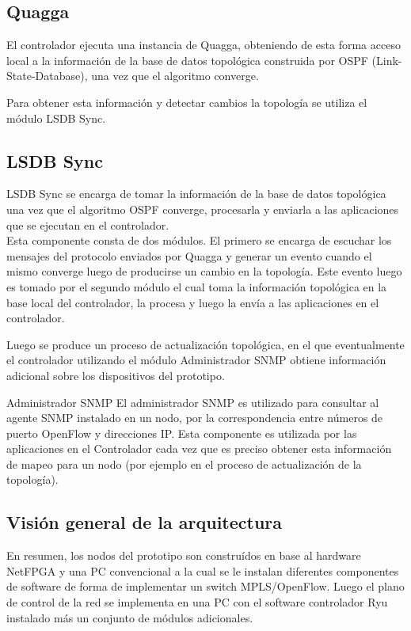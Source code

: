 \subsection{Quagga}
El controlador ejecuta una instancia de Quagga, obteniendo de esta forma acceso local a la información de la base de datos topol\'ogica construida por OSPF (Link-State-Database), una vez que el algoritmo converge.

Para obtener esta informaci\'on y detectar cambios la topolog\'ia se utiliza el m\'odulo LSDB Sync.

\subsection{LSDB Sync}
LSDB Sync se encarga de tomar la información de la base de datos topol\'ogica una vez que el algoritmo OSPF converge, procesarla y enviarla a las aplicaciones que se ejecutan en el controlador.\\

Esta componente consta de dos módulos. El primero se encarga de escuchar los mensajes del protocolo enviados por Quagga y generar un evento cuando el mismo converge luego de producirse un cambio en la topolog\'ia. Este evento luego es tomado por el segundo m\'odulo el cual toma la información topol\'ogica en la base local del controlador, la procesa y luego la env\'ia a las aplicaciones en el controlador.

Luego se produce un proceso de actualizaci\'on topol\'ogica, en el que eventualmente el controlador utilizando el m\'odulo Administrador SNMP obtiene informaci\'on adicional sobre los dispositivos del prototipo. 

\begin{subsection}{Administrador SNMP}
El administrador SNMP es utilizado para consultar al agente SNMP instalado en un nodo, por la correspondencia entre números de puerto OpenFlow y direcciones IP. Esta componente es utilizada por las aplicaciones en el Controlador cada vez que es preciso obtener esta información de mapeo para un nodo (por ejemplo en el proceso de actualización de la topolog\'ia).

\end{subsection}

\subsection{Visi\'on general de la arquitectura}

En resumen, los nodos del prototipo son constru\'idos en base al hardware NetFPGA y una PC convencional a la cual se le instalan diferentes componentes de software de forma de implementar un switch MPLS/OpenFlow. Luego el plano de control de la red se implementa en una PC con el software controlador Ryu instalado m\'as un conjunto de m\'odulos adicionales.

